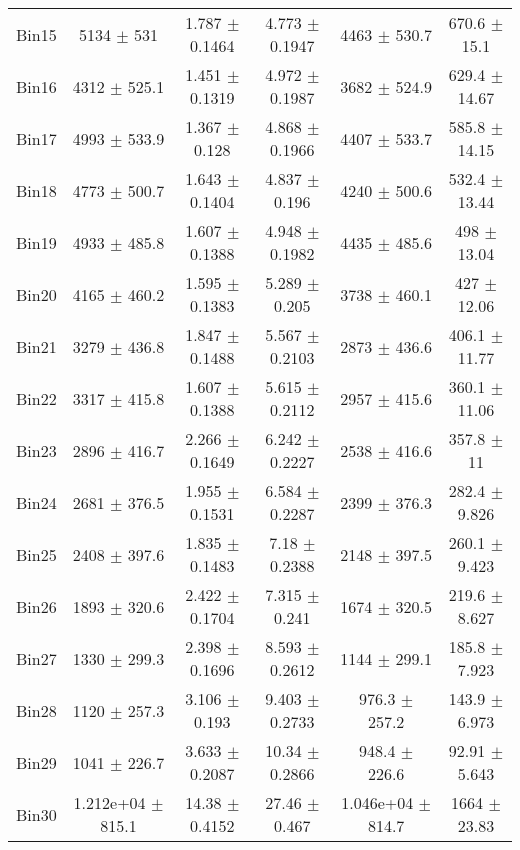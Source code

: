 \begin{tabular}{@{\extracolsep{4pt}}lccccc@{}}
     Bin15 & 5134 $\pm$ 531 & 1.787 $\pm$ 0.1464 & 4.773 $\pm$ 0.1947 & 4463 $\pm$ 530.7 & 670.6 $\pm$ 15.1 \\ 
     Bin16 & 4312 $\pm$ 525.1 & 1.451 $\pm$ 0.1319 & 4.972 $\pm$ 0.1987 & 3682 $\pm$ 524.9 & 629.4 $\pm$ 14.67 \\ 
     Bin17 & 4993 $\pm$ 533.9 & 1.367 $\pm$ 0.128 & 4.868 $\pm$ 0.1966 & 4407 $\pm$ 533.7 & 585.8 $\pm$ 14.15 \\ 
     Bin18 & 4773 $\pm$ 500.7 & 1.643 $\pm$ 0.1404 & 4.837 $\pm$ 0.196 & 4240 $\pm$ 500.6 & 532.4 $\pm$ 13.44 \\ 
     Bin19 & 4933 $\pm$ 485.8 & 1.607 $\pm$ 0.1388 & 4.948 $\pm$ 0.1982 & 4435 $\pm$ 485.6 & 498 $\pm$ 13.04 \\ 
     Bin20 & 4165 $\pm$ 460.2 & 1.595 $\pm$ 0.1383 & 5.289 $\pm$ 0.205 & 3738 $\pm$ 460.1 & 427 $\pm$ 12.06 \\ 
     Bin21 & 3279 $\pm$ 436.8 & 1.847 $\pm$ 0.1488 & 5.567 $\pm$ 0.2103 & 2873 $\pm$ 436.6 & 406.1 $\pm$ 11.77 \\ 
     Bin22 & 3317 $\pm$ 415.8 & 1.607 $\pm$ 0.1388 & 5.615 $\pm$ 0.2112 & 2957 $\pm$ 415.6 & 360.1 $\pm$ 11.06 \\ 
     Bin23 & 2896 $\pm$ 416.7 & 2.266 $\pm$ 0.1649 & 6.242 $\pm$ 0.2227 & 2538 $\pm$ 416.6 & 357.8 $\pm$ 11 \\ 
     Bin24 & 2681 $\pm$ 376.5 & 1.955 $\pm$ 0.1531 & 6.584 $\pm$ 0.2287 & 2399 $\pm$ 376.3 & 282.4 $\pm$ 9.826 \\ 
     Bin25 & 2408 $\pm$ 397.6 & 1.835 $\pm$ 0.1483 & 7.18 $\pm$ 0.2388 & 2148 $\pm$ 397.5 & 260.1 $\pm$ 9.423 \\ 
     Bin26 & 1893 $\pm$ 320.6 & 2.422 $\pm$ 0.1704 & 7.315 $\pm$ 0.241 & 1674 $\pm$ 320.5 & 219.6 $\pm$ 8.627 \\ 
     Bin27 & 1330 $\pm$ 299.3 & 2.398 $\pm$ 0.1696 & 8.593 $\pm$ 0.2612 & 1144 $\pm$ 299.1 & 185.8 $\pm$ 7.923 \\ 
     Bin28 & 1120 $\pm$ 257.3 & 3.106 $\pm$ 0.193 & 9.403 $\pm$ 0.2733 & 976.3 $\pm$ 257.2 & 143.9 $\pm$ 6.973 \\ 
     Bin29 & 1041 $\pm$ 226.7 & 3.633 $\pm$ 0.2087 & 10.34 $\pm$ 0.2866 & 948.4 $\pm$ 226.6 & 92.91 $\pm$ 5.643 \\ 
     Bin30 & 1.212e+04 $\pm$ 815.1 & 14.38 $\pm$ 0.4152 & 27.46 $\pm$ 0.467 & 1.046e+04 $\pm$ 814.7 & 1664 $\pm$ 23.83 \\ 
\hline\hline
  \end{tabular}
